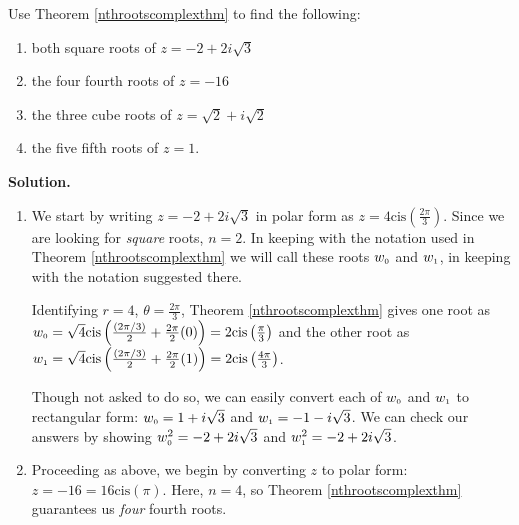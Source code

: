 \documentclass{ximera}
\begin{document}
\begin{ex} \label{nthrootscomplexex}  Use Theorem \ref{nthrootscomplexthm} to find the following:

\begin{enumerate}

\item  both square roots of $z = -2  + 2i\sqrt{3}$

\item  \label{fourthrootsneg16} the four fourth roots of $z = -16$

\item  \label{halfanglecuberoot} the three cube roots of $z = \sqrt{2} + i \sqrt{2}$

\item  \label{calculatorfifthroot} the five fifth roots of $z = 1$.

\end{enumerate}

{\bf Solution.}

\begin{enumerate}

\item  We start by writing $z= - 2 + 2i\sqrt{3}$ in polar form as $z = 4 \text{cis}\left(\frac{2\pi}{3}\right)$. Since we are looking for \textit{square} roots, $n=2$.  In keeping with the notation used in Theorem \ref{nthrootscomplexthm}  we will call these roots  $w_{\text{\tiny$0$}}$ and $w_{\text{\tiny$1$}}$, in keeping with the notation suggested there.  

\smallskip

 Identifying $r =4$,  $\theta = \frac{2\pi}{3}$, Theorem \ref{nthrootscomplexthm} gives  one root as $w_{\text{\tiny$0$}} = \sqrt{4} \text{cis}\left(\frac{(2\pi/3)}{2} + \frac{2\pi}{2} (0)\right) = 2\text{cis}\left(\frac{\pi}{3}\right)$ and the other root as $w_{\text{\tiny$1$}} = \sqrt{4} \text{cis}\left(\frac{(2\pi/3)}{2} + \frac{2\pi}{2} (1)\right) = 2\text{cis}\left(\frac{4\pi}{3}\right)$.   
 
 \smallskip
 
 Though not asked to do so, we can easily convert each of $w_{\text{\tiny$0$}}$ and $w_{\text{\tiny$1$}}$ to  rectangular form:  $w_{\text{\tiny$0$}}  =  1+i\sqrt{3}$ and $w_{\text{\tiny$1$}}  = -1-i\sqrt{3}$.  We can check our answers by showing $w_{\text{\tiny$0$}}^2= -2 + 2i\sqrt{3}$ and $w_{\text{\tiny$1$}}^2= -2 + 2i\sqrt{3}$.

\item  Proceeding as above, we begin by converting $z$ to polar form: $z = -16 = 16 \text{cis}(\pi)$.  Here, $n = 4$, so Theorem \ref{nthrootscomplexthm} guarantees  us \textit{four} fourth roots.


\end{enumerate}
\end{ex}
\end{document}
